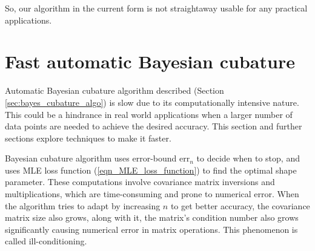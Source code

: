 \documentclass[smallextended]{svjour3}       %
\newcommand{\errn}{\text{err}_{n}}
\begin{document}
So, our algorithm in the current form is not straightaway usable for any practical applications.








































































\section{Fast automatic Bayesian cubature}\label{fast_transform_kernel}
{Automatic Bayesian cubature algorithm} described (Section \ref{sec:bayes_cubature_algo}) is slow due to its computationally intensive nature. This could be a hindrance in real world applications when a larger number of data points are needed to achieve the desired accuracy. This section and further sections explore techniques to make it faster.

Bayesian cubature algorithm uses error-bound $\errn$ to decide when to stop, and uses MLE loss function (\ref{eqn_MLE_loss_function}) to find the optimal {shape parameter}.
These computations involve covariance matrix inversions and multiplications, which are time-consuming and prone to numerical error. 
When the algorithm tries to adapt by increasing $n$ to get better accuracy, the covariance matrix size also grows, along with it, the matrix's condition number also grows significantly causing numerical error in matrix operations. This phenomenon is called ill-conditioning.
\end{document}
